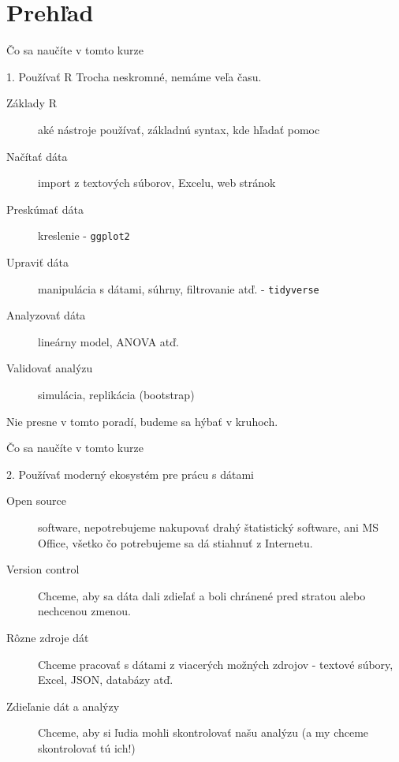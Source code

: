 \section{Prehľad}
\begin{frame}{Čo sa naučíte v tomto kurze}
	\begin{block}{1. Používať R}
		Trocha neskromné, nemáme veľa času.
		\begin{description}
			\item[Základy R] aké nástroje používať, základnú syntax, kde hľadať pomoc
			\item[Načítať dáta] import z textových súborov, Excelu, web stránok
			\item[Preskúmať dáta] kreslenie - \texttt{ggplot2}
			\item[Upraviť dáta] manipulácia s dátami, súhrny, filtrovanie atď. - \texttt{tidyverse}
			\item[Analyzovať dáta] lineárny model, ANOVA atď.
			\item[Validovať analýzu] simulácia, replikácia (bootstrap)
		\end{description}
		Nie presne v tomto poradí, budeme sa hýbať v kruhoch.
	\end{block}
\end{frame}

\begin{frame}{Čo sa naučíte v tomto kurze}
	\begin{block}{2. Používať moderný ekosystém pre prácu s dátami}
		\begin{description}
			\item[Open source] software, nepotrebujeme nakupovať drahý štatistický software, ani MS Office, všetko čo potrebujeme sa dá stiahnuť z Internetu.
			\item[Version control] Chceme, aby sa dáta dali zdieľať a boli chránené pred stratou alebo nechcenou zmenou.
			\item[Rôzne zdroje dát] Chceme pracovať s dátami z viacerých možných zdrojov - textové súbory, Excel, JSON, databázy atď.
			\item[Zdieľanie dát a analýzy] Chceme, aby si ľudia mohli skontrolovať našu analýzu (a my chceme skontrolovať tú ich!)
		\end{description}
	\end{block}
\end{frame}


